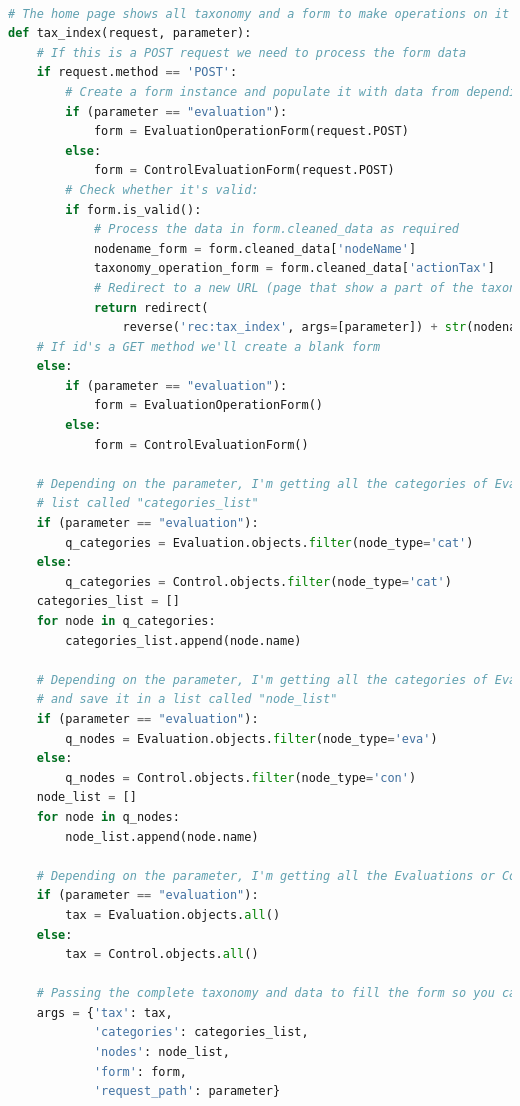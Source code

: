 \lstset{style=python_code_style}
\label{lst:view}
\begin{lstlisting}[language=Python, caption={Parti principali del codice delle View della soluzione per gestire la navigazione 
	delle tassonomie, quella delle Evaluation e quella dei Controlli}]

# The home page shows all taxonomy and a form to make operations on it
def tax_index(request, parameter):
	# If this is a POST request we need to process the form data
	if request.method == 'POST':
		# Create a form instance and populate it with data from depending on the parameter
		if (parameter == "evaluation"):
			form = EvaluationOperationForm(request.POST)
		else:
			form = ControlEvaluationForm(request.POST)
		# Check whether it's valid:
		if form.is_valid():
			# Process the data in form.cleaned_data as required
			nodename_form = form.cleaned_data['nodeName']
			taxonomy_operation_form = form.cleaned_data['actionTax']
			# Redirect to a new URL (page that show a part of the taxonomy, depending on the action user has chosen):
			return redirect(
				reverse('rec:tax_index', args=[parameter]) + str(nodename_form) + '_' + taxonomy_operation_form)
	# If id's a GET method we'll create a blank form
	else:
		if (parameter == "evaluation"):
			form = EvaluationOperationForm()
		else:
			form = ControlEvaluationForm()

	# Depending on the parameter, I'm getting all the categories of Evaluations or Controls taxonomy and save it in a
	# list called "categories_list"
	if (parameter == "evaluation"):
		q_categories = Evaluation.objects.filter(node_type='cat')
	else:
		q_categories = Control.objects.filter(node_type='cat')
	categories_list = []
	for node in q_categories:
		categories_list.append(node.name)

	# Depending on the parameter, I'm getting all the categories of Evaluations or Controls node in the taxonomy
	# and save it in a list called "node_list"
	if (parameter == "evaluation"):
		q_nodes = Evaluation.objects.filter(node_type='eva')
	else:
		q_nodes = Control.objects.filter(node_type='con')
	node_list = []
	for node in q_nodes:
		node_list.append(node.name)

	# Depending on the parameter, I'm getting all the Evaluations or Controls taxonomy
	if (parameter == "evaluation"):
		tax = Evaluation.objects.all()
	else:
		tax = Control.objects.all()

	# Passing the complete taxonomy and data to fill the form so you can operate on the taxonomy
	args = {'tax': tax,
			'categories': categories_list,
			'nodes': node_list,
			'form': form,
			'request_path': parameter}


\end{lstlisting}
